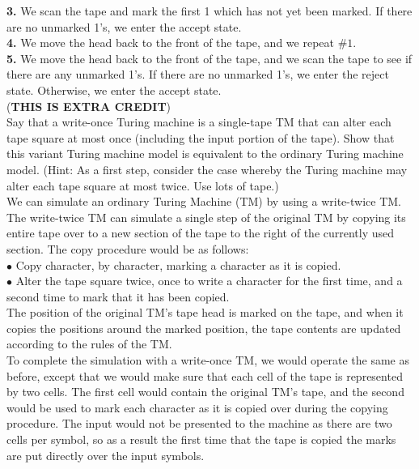 \documentclass[12pt]{article}
\begin{document}
\textbf{3.} We scan the tape and mark the first 1 which has not yet been marked. If 
there are no unmarked 1's, we enter the accept state. \\

\textbf{4.} We move the head back to the front of the tape, and we repeat $\#1$. \\

\textbf{5.} We move the head back to the front of the tape, and we scan the tape
to see if there are any unmarked 1's. If there are no unmarked 1's, we enter the 
reject state. Otherwise, we enter the accept state. \\


 (\textbf{THIS IS EXTRA CREDIT}) \\

Say that a write-once Turing machine is a single-tape TM that can alter each tape
square at most once (including the input portion of the tape). Show that this variant
Turing machine model is equivalent to the ordinary Turing machine model. 
(Hint: As a first step, consider the case whereby the Turing machine may alter each
tape square at most twice. Use lots of tape.) \\

We can simulate an ordinary Turing Machine (TM) by using a write-twice TM. The
write-twice TM can simulate a single step of the original TM by copying its entire
tape over to a new section of the tape to the right of the currently used section.
The copy procedure would be as follows: \\

$\bullet$ Copy character, by character, marking a character as it is copied. \\
$\bullet$ Alter the tape square twice, once to write a character for the first time, and
a second time to mark that it has been copied. \\

The position of the original TM's tape head is marked on the tape, and when it
copies the positions around the marked position, the tape contents are updated
according to the rules of the TM. \\

To complete the simulation with a write-once TM, we would operate the same as before,
except that we would make sure that each cell of the tape is represented by two cells.
The first cell would contain the original TM's tape, and the second would be used to
mark each character as it is copied over during the copying procedure. The input would
not be presented to the machine as there are two cells per symbol, so as a result the
first time that the tape is copied the marks are put directly over the input symbols. \\
\end{document}
